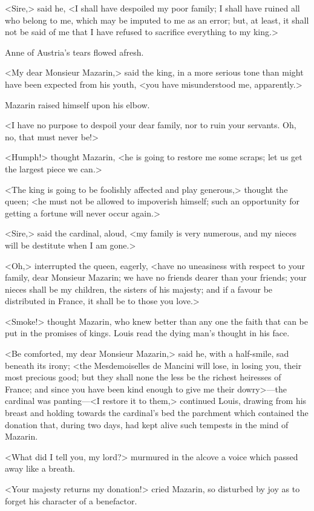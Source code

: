<Sire,> said he, <I shall have despoiled my poor family; I shall have ruined all who belong to me, which may be imputed to me as an error; but, at least, it shall not be said of me that I have refused to sacrifice everything to my king.>

Anne of Austria's tears flowed afresh.

<My dear Monsieur Mazarin,> said the king, in a more serious tone than might have been expected from his youth, <you have misunderstood me, apparently.>

Mazarin raised himself upon his elbow.

<I have no purpose to despoil your dear family, nor to ruin your servants. Oh, no, that must never be!>

<Humph!> thought Mazarin, <he is going to restore me some scraps; let us get the largest piece we can.>

<The king is going to be foolishly affected and play generous,> thought the queen; <he must not be allowed to impoverish himself; such an opportunity for getting a fortune will never occur again.>

<Sire,> said the cardinal, aloud, <my family is very numerous, and my nieces will be destitute when I am gone.>

<Oh,> interrupted the queen, eagerly, <have no uneasiness with respect to your family, dear Monsieur Mazarin; we have no friends dearer than your friends; your nieces shall be my children, the sisters of his majesty; and if a favour be distributed in France, it shall be to those you love.>

<Smoke!> thought Mazarin, who knew better than any one the faith that can be put in the promises of kings. Louis read the dying man's thought in his face.

<Be comforted, my dear Monsieur Mazarin,> said he, with a half-smile, sad beneath its irony; <the Mesdemoiselles de Mancini will lose, in losing you, their most precious good; but they shall none the less be the richest heiresses of France; and since you have been kind enough to give me their dowry>—the cardinal was panting—<I restore it to them,> continued Louis, drawing from his breast and holding towards the cardinal's bed the parchment which contained the donation that, during two days, had kept alive such tempests in the mind of Mazarin.

<What did I tell you, my lord?> murmured in the alcove a voice which passed away like a breath.

<Your majesty returns my donation!> cried Mazarin, so disturbed by joy as to forget his character of a benefactor.

